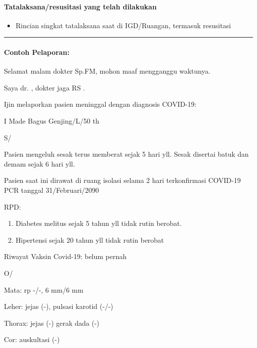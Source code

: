 \documentclass[
]{book}
\providecommand{\tightlist}{%
  \setlength{\itemsep}{0pt}\setlength{\parskip}{0pt}}
\begin{document}
\hypertarget{tatalaksanaresusitasi-yang-telah-dilakukan-4}{%
\paragraph{Tatalaksana/resusitasi yang telah dilakukan}\label{tatalaksanaresusitasi-yang-telah-dilakukan-4}}

\begin{itemize}
\tightlist
\item
  Rincian singkat tatalaksana saat di IGD/Ruangan, termasuk resusitasi
\end{itemize}

\begin{center}\rule{0.5\linewidth}{0.5pt}\end{center}

\hypertarget{contoh-pelaporan-3}{%
\paragraph{Contoh Pelaporan:}\label{contoh-pelaporan-3}}

Selamat malam dokter Sp.FM, mohon maaf mengganggu waktunya.

Saya dr. , dokter jaga RS .

Ijin melaporkan pasien meninggal dengan diagnosis COVID-19:

I Made Bagus Genjing/L/50 th

S/

Pasien mengeluh sesak terus memberat sejak 5 hari yll. Sesak disertai batuk dan demam sejak 6 hari yll.

Pasien saat ini dirawat di ruang isolasi selama 2 hari terkonfirmasi COVID-19 PCR tanggal 31/Februari/2090

RPD:

\begin{enumerate}
\def\labelenumi{\arabic{enumi}.}
\item
  Diabetes melitus sejak 5 tahun yll tidak rutin berobat.
\item
  Hipertensi sejak 20 tahun yll tidak rutin berobat
\end{enumerate}

Riwayat Vaksin Covid-19: belum pernah

O/

Mata: rp -/-, 6 mm/6 mm

Leher: jejas (-), pulsasi karotid (-/-)

Thorax: jejas (-) gerak dada (-)

Cor: auskultasi (-)
\end{document}
